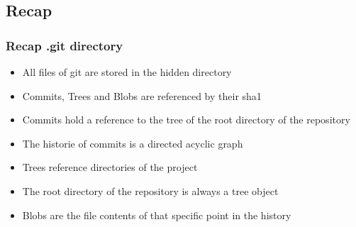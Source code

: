 \subsection{Recap}
\begin{frame}
    \frametitle{Recap .git directory}
    \begin{itemize}
        \item All files of git are stored in the hidden directory
        \item Commits, Trees and Blobs are referenced by their sha1\footnotemark
        \item Commits hold a reference to the tree of the root directory of the repository
        \item The historie of commits is a directed acyclic graph\footnotemark
        \item Trees reference directories of the project
        \item The root directory of the repository is always a tree object
        \item Blobs are the file contents of that specific point in the history
    \end{itemize}
\end{frame}

